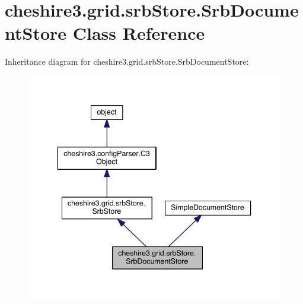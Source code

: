 \hypertarget{classcheshire3_1_1grid_1_1srb_store_1_1_srb_document_store}{\section{cheshire3.\-grid.\-srb\-Store.\-Srb\-Document\-Store Class Reference}
\label{classcheshire3_1_1grid_1_1srb_store_1_1_srb_document_store}
}


Inheritance diagram for cheshire3.\-grid.\-srb\-Store.\-Srb\-Document\-Store\-:
\nopagebreak
\begin{figure}[H]
\begin{center}
\leavevmode
\includegraphics[width=343pt]{classcheshire3_1_1grid_1_1srb_store_1_1_srb_document_store__inherit__graph}
\end{center}
\end{figure}


